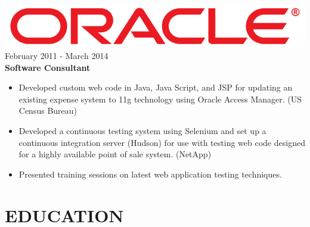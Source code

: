 \documentclass[12pt, line, margin]{res}
\begin{document}
\begin{resume}
                {\sl \includegraphics[scale=0.1]{resume_images/663px-Oracle_logo.png}} \hfill            February 2011 - March 2014 \\
                \textbf{Software Consultant}
                \begin{itemize}  \itemsep -2pt %
	      \item Developed custom web code in Java, Java Script, and JSP for \newline 
                               updating an existing expense system to 11g technology using \newline 
                               Oracle Access Manager. (US Census Bureau)
	      \item Developed a continuous testing system using Selenium
                               and set up a continuous integration server (Hudson)
                               for use with testing web code designed for a
                               highly available point of sale system. (NetApp)
	      \item Presented training sessions on latest web application testing \newline
                               techniques.
                 \end{itemize} 

\section{EDUCATION}


\end{resume}
\end{document}

